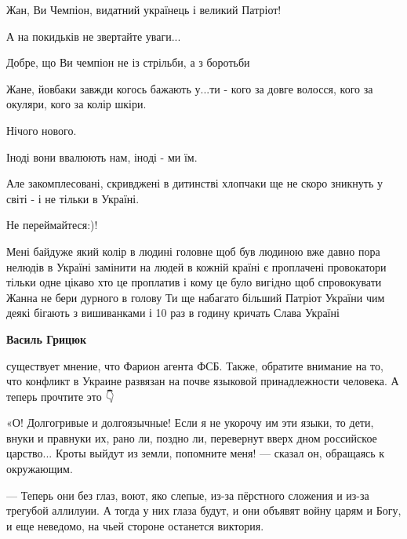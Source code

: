 \begin{itemize}

Жан, Ви Чемпіон, видатний українець і великий Патріот!

А на покидьків не звертайте уваги...

Добре, що Ви чемпіон не із стрільби, а з боротьби👊


Жане, йовбаки завжди когось бажають у...ти - кого за довге волосся, кого за окуляри, кого за колір шкіри.

Нічого нового.

Іноді вони ввалюють нам, іноді - ми їм.

Але закомплесовані, скривджені в дитинстві хлопчаки ще не скоро зникнуть у світі - і не тільки в Україні.

Не переймайтеся:)!


Мені байдуже який колір в людині головне щоб був людиною вже давно пора нелюдів
в Україні замінити на людей в кожній країні є проплачені провокатори тільки
одне цікаво хто це проплатив і кому це було вигідно щоб спровокувати Жанна не
бери дурного в голову Ти ще набагато більший Патріот України чим деякі бігають
з вишиванками і 10 раз в годину кричать Слава Україні

\begin{itemize}

 
\textbf{Василь Грицюк} 

существует мнение, что Фарион агента ФСБ. Также, обратите внимание на то, что
конфликт в Украине развязан на почве языковой принадлежности человека. А теперь
прочтите это 👇

«О! Долгогривые и долгоязычные! Если я не укорочу им эти языки, то дети, внуки
и правнуки их, рано ли, поздно ли, перевернут вверх дном российское царство...
Кроты выйдут из земли, попомните меня! — сказал он, обращаясь к окружающим.

— Теперь они без глаз, воют, яко слепые, из-за пёрстного сложения и из-за
трегубой аллилуии. А тогда у них глаза будут, и они объявят войну царям и Богу,
и еще неведомо, на чьей стороне останется виктория.


\end{itemize}
\end{itemize}
